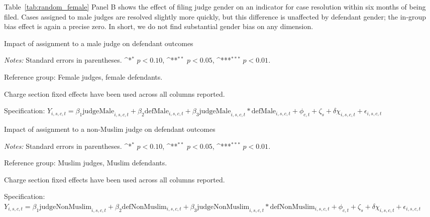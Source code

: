 \documentclass[12pt,english]{article}
\def\sym#1{\ifmmode^{#1}\else\(^{#1}\)\fi}
\begin{document}
Table~\ref{tab:random_female} Panel B shows the effect of filing judge gender on an indicator for case resolution within six months of being filed. Cases assigned to male judges are resolved slightly more quickly, but this difference is unaffected by defendant gender; the in-group bias effect is again a precise zero. In short, we do not find substantial gender bias on any dimension.


\begin{table}
    \begin{center}
        \caption{Impact of assignment to a male judge on defendant outcomes}
        \label{tab:random_female}
        
        \vspace{2mm}
        
    \end{center}
    \begin{minipage}{1.3\textwidth}
        \footnotesize 
        \emph{Notes:} Standard errors in parentheses. \sym{*} \(p<0.10\), \sym{**} \(p<0.05\), \sym{***} \(p<0.01\).  \par 
        Reference group: Female judges, female defendants.  \par
        Charge section fixed effects have been used across all columns reported. \par
        Specification: $Y_{i,s,c,t} = \beta_{1} \text{judgeMale}_{i,s,c,t} + \beta_{2} \text{defMale}_{i,s,c,t} + \beta_{3} \text{judgeMale}_{i,s,c,t} * \text{defMale}_{i,s,c,t} + \phi_{c,t} + \zeta_{s} + \delta \chi_{i,s,c,t} + \epsilon_{i,s,c,t}$ \par
   \end{minipage}
\end{table}

\begin{table}
    \begin{center}
        \caption{Impact of assignment to a non-Muslim judge on defendant outcomes}
        \label{tab:random_muslim}
        
        \vspace{2mm}
        
    \end{center}
    \begin{minipage}{1.6\textwidth}
        \footnotesize 
        \emph{Notes:} Standard errors in parentheses. \sym{*} \(p<0.10\), \sym{**} \(p<0.05\), \sym{***} \(p<0.01\).  \par 
        Reference group: Muslim judges, Muslim defendants.  \par
        Charge section fixed effects have been used across all columns reported. \par
        Specification: $Y_{i,s,c,t} = \beta_{1} \text{judgeNonMuslim}_{i,s,c,t} + \beta_{2} \text{defNonMuslim}_{i,s,c,t} + \beta_{3} \text{judgeNonMuslim}_{i,s,c,t} * \text{defNonMuslim}_{i,s,c,t} + \phi_{c,t} + \zeta_{s} + \delta \chi_{i,s,c,t} + \epsilon_{i,s,c,t}$  \par
   \end{minipage}
\end{table}
    
\end{document}
